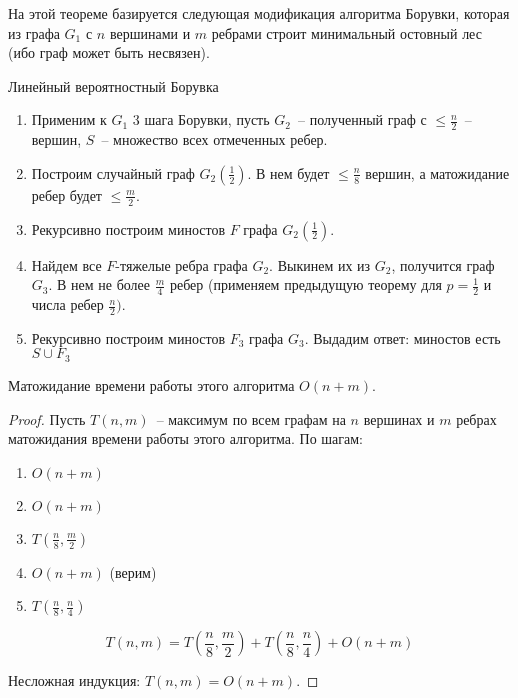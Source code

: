 На этой теореме базируется следующая модификация алгоритма Борувки, которая из графа $G_1$ с $n$ вершинами и $m$ ребрами строит минимальный остовный лес (ибо граф может быть несвязен).

\begin{algodescription}{Линейный вероятностный Борувка}
\begin{enumerate}
    \item Применим к $G_1$ 3 шага Борувки, пусть $G_2$~-- полученный граф с $\leq \frac{n}{2}$~-- вершин, $S$~-- множество всех отмеченных ребер.
    \item Построим случайный граф $G_2(\frac{1}{2})$. В нем будет $\leq\frac{n}{8}$ вершин, а матожидание ребер будет $\leq\frac{m}{2}$.
    \item Рекурсивно построим миностов $F$ графа $G_2(\frac{1}{2})$.
    \item Найдем все $F$-тяжелые ребра графа $G_2$. Выкинем их из $G_2$, получится граф $G_3$. В нем не более $\frac{m}{4}$ ребер (применяем предыдущую теорему для $p=\frac{1}{2}$ и числа ребер $\frac{n}{2})$.
    \item Рекурсивно построим миностов $F_3$ графа $G_3$. Выдадим ответ: миностов есть $S \cup F_3$
\end{enumerate}
\end{algodescription}

\begin{theorem*}
    Матожидание времени работы этого алгоритма $O(n+m)$.
\end{theorem*}
\begin{proof}
    Пусть $T(n, m)$~-- максимум по всем графам на $n$ вершинах и $m$ ребрах матожидания времени работы этого алгоритма.
    По шагам:
    \begin{enumerate}
        \item $O(n+m)$
        \item $O(n+m)$
        \item $T(\frac{n}{8}, \frac{m}{2})$
        \item $O(n+m)$ (верим)
        \item $T(\frac{n}{8}, \frac{n}{4})$
    \end{enumerate}
    
    $$T(n, m) = T(\frac{n}{8}, \frac{m}{2}) + T(\frac{n}{8}, \frac{n}{4}) + O(n+m)$$
    
    Несложная индукция: $T(n, m) = O(n+m)$.
\end{proof}
